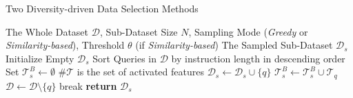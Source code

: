 

\begin{algorithm}[h]
\caption{Two Diversity-driven Data Selection Methods}\label{algorithm:merged}
\begin{algorithmic}[1]
\REQUIRE The Whole Dataset $\mathcal{D}$, Sub-Dataset Size $N$, Sampling Mode (\textit{Greedy} or \textit{Similarity-based}), Threshold $\theta$ (if \textit{Similarity-based})
\ENSURE The Sampled Sub-Dataset $\mathcal{D}_s$
\STATE Initialize Empty $\mathcal{D}_s$
\STATE Sort Queries in $\mathcal{D}$ by instruction length in descending order
    \STATE Set $\mathcal{T}_s^B \leftarrow \emptyset$  \#$\mathcal{T}$ is the set of activated features
            \STATE $\mathcal{D}_s \leftarrow \mathcal{D}_s \cup \{q\}$
            \STATE $\mathcal{T}_s^B \leftarrow \mathcal{T}_s^B \cup \mathcal{T}_q$
            \STATE $\mathcal{D} \leftarrow \mathcal{D} \setminus \{q\}$
                \STATE break
            \ENDIF
        \ENDIF
    \ENDFOR
\ENDWHILE
\STATE \textbf{return} $\mathcal{D}_s$
\end{algorithmic}
\end{algorithm}


 

